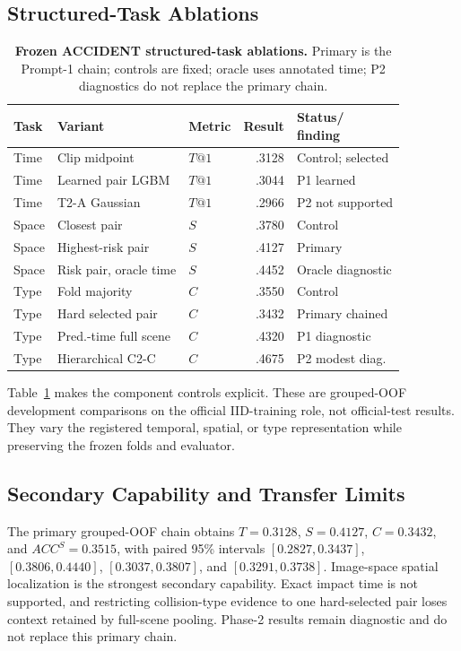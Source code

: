 \documentclass[letterpaper]{article}
\begin{document}
\subsection{Structured-Task Ablations}
\begin{table}[t]
\centering
\scriptsize
\setlength{\tabcolsep}{1.0pt}
\caption{\textbf{Frozen ACCIDENT structured-task ablations.} Primary is the Prompt-1 chain; controls are fixed; oracle uses annotated time; P2 diagnostics do not replace the primary chain.}
\label{tab:accident-ablations}
\begin{tabular}{@{}p{0.95cm}p{2.15cm}p{0.80cm}rp{2.30cm}@{}}
\toprule
Task & Variant & Metric & Result & \shortstack{Status/\\finding} \\
\midrule
Time & Clip midpoint & $T@1$ & .3128 & Control; selected \\
Time & Learned pair LGBM & $T@1$ & .3044 & P1 learned \\
Time & T2-A Gaussian & $T@1$ & .2966 & P2 not supported \\
Space & Closest pair & $S$ & .3780 & Control \\
Space & Highest-risk pair & $S$ & .4127 & Primary \\
Space & Risk pair, oracle time & $S$ & .4452 & Oracle diagnostic \\
Type & Fold majority & $C$ & .3550 & Control \\
Type & Hard selected pair & $C$ & .3432 & Primary chained \\
Type & Pred.-time full scene & $C$ & .4320 & P1 diagnostic \\
Type & Hierarchical C2-C & $C$ & .4675 & P2 modest diag. \\
\bottomrule
\end{tabular}
\end{table}

Table~\ref{tab:accident-ablations} makes the component controls explicit. These are grouped-OOF development comparisons on the official IID-training role, not official-test results. They vary the registered temporal, spatial, or type representation while preserving the frozen folds and evaluator.

\subsection{Secondary Capability and Transfer Limits}
The primary grouped-OOF chain obtains $T=0.3128$, $S=0.4127$, $C=0.3432$, and $ACC^{S}=0.3515$, with paired 95\% intervals $[0.2827,0.3437]$, $[0.3806,0.4440]$, $[0.3037,0.3807]$, and $[0.3291,0.3738]$. Image-space spatial localization is the strongest secondary capability. Exact impact time is not supported, and restricting collision-type evidence to one hard-selected pair loses context retained by full-scene pooling. Phase-2 results remain diagnostic and do not replace this primary chain.
\clearpage
\end{document}

